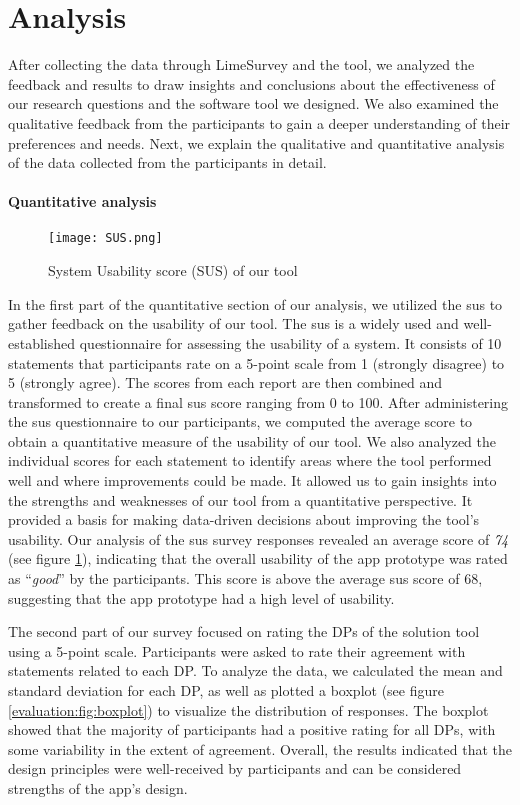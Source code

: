 \clearpage
\section{Analysis}
\label{evaluation:section:analysis}
After collecting the data through LimeSurvey and the tool, we analyzed the feedback and results to draw insights and conclusions about the effectiveness of our research questions and the software tool we designed. 
We also examined the qualitative feedback from the participants to gain a deeper understanding of their preferences and needs. 
Next, we explain the qualitative and quantitative analysis of the data collected from the participants in detail.

\paragraph{Quantitative analysis}
\begin{figure}[ht]
    \centering
    \texttt{[image: SUS.png]}
    \caption{System Usability score (SUS) of our tool}
    \label{evaluation:fig:sus}
\end{figure}
In the first part of the quantitative section of our analysis, we utilized the \ac{sus} to gather feedback on the usability of our tool. 
The \ac{sus} is a widely used and well-established questionnaire for assessing the usability of a system. 
It consists of 10 statements that participants rate on a 5-point scale from 1 (strongly disagree) to 5 (strongly agree). 
The scores from each report are then combined and transformed to create a final \ac{sus} score ranging from 0 to 100.
After administering the \ac{sus} questionnaire to our participants, we computed the average score to obtain a quantitative measure of the usability of our tool. 
We also analyzed the individual scores for each statement to identify areas where the tool performed well and where improvements could be made. 
It allowed us to gain insights into the strengths and weaknesses of our tool from a quantitative perspective. 
It provided a basis for making data-driven decisions about improving the tool's usability. 
Our analysis of the \ac{sus} survey responses revealed an average score of \textit{74} (see figure \ref{evaluation:fig:sus}), indicating that the overall usability of the app prototype was rated as ``\textit{good}'' by the participants.
This score is above the average \ac{sus} score of 68, suggesting that the app prototype had a high level of usability.

The second part of our survey focused on rating the DPs of the solution tool using a 5-point scale. 
Participants were asked to rate their agreement with statements related to each DP. 
To analyze the data, we calculated the mean and standard deviation for each DP, as well as plotted a boxplot (see figure \ref{evaluation:fig:boxplot}) to visualize the distribution of responses. 
The boxplot showed that the majority of participants had a positive rating for all DPs, with some variability in the extent of agreement. 
Overall, the results indicated that the design principles were well-received by participants and can be considered strengths of the app's design.


